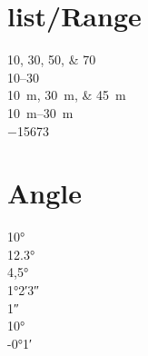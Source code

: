 \section{list/Range}
\numlist{10;30;50;70} \\
\numrange{10}{30}\\
\SIlist{10;30;45}{\metre}\\
\SIrange{10}{30}{\metre} \\
\num[negative-color = red]{-15673}

\section{Angle}
\ang{10}    \\
\ang{12.3}  \\
\ang{4,5}   \\
\ang{1;2;3} \\
\ang{;;1}   \\
\ang{+10;;} \\
\ang{-0;1;}









